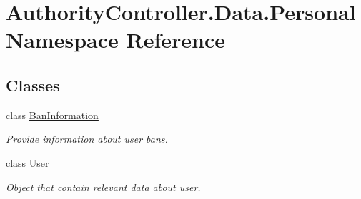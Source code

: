 \hypertarget{namespace_authority_controller_1_1_data_1_1_personal}{}\section{Authority\+Controller.\+Data.\+Personal Namespace Reference}
\label{namespace_authority_controller_1_1_data_1_1_personal}
\subsection*{Classes}
\begin{DoxyCompactItemize}
\item 
class \mbox{\hyperlink{class_authority_controller_1_1_data_1_1_personal_1_1_ban_information}{Ban\+Information}}
\begin{DoxyCompactList}\small\item\em Provide information about user bans. \end{DoxyCompactList}\item 
class \mbox{\hyperlink{class_authority_controller_1_1_data_1_1_personal_1_1_user}{User}}
\begin{DoxyCompactList}\small\item\em Object that contain relevant data about user. \end{DoxyCompactList}\end{DoxyCompactItemize}
